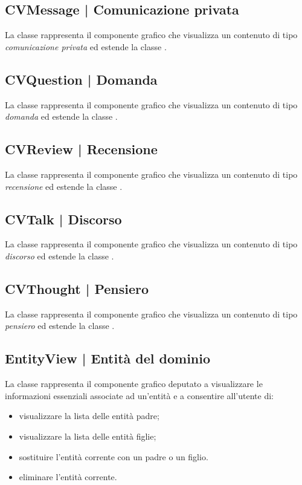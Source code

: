 \documentclass[10pt,a4paper,headinclude,footinclude,hidelinks]{scrreprt} %
\begin{document}
	\subsection[CVMessage]{CVMessage | Comunicazione privata}
	\label{sec:stage:design:view:message}
	La classe rappresenta il componente grafico che visualizza un contenuto di tipo \textit{comunicazione privata} ed estende la classe \textit{}.

	\subsection[CVQuestion]{CVQuestion | Domanda}
	\label{sec:stage:design:view:question}
	La classe rappresenta il componente grafico che visualizza un contenuto di tipo \textit{domanda} ed estende la classe \textit{}.

	\subsection[CVReview]{CVReview | Recensione}
	\label{sec:stage:design:view:review}
	La classe rappresenta il componente grafico che visualizza un contenuto di tipo \textit{recensione} ed estende la classe \textit{}.

	\subsection[CVTalk]{CVTalk | Discorso}
	\label{sec:stage:design:view:talk}
	La classe rappresenta il componente grafico che visualizza un contenuto di tipo \textit{discorso} ed estende la classe \textit{}.

	\subsection[CVThought]{CVThought | Pensiero}
	\label{sec:stage:design:view:thought}
	La classe rappresenta il componente grafico che visualizza un contenuto di tipo \textit{pensiero} ed estende la classe \textit{}.

	\subsection[EntityView]{EntityView | Entità del dominio}
	\label{sec:stage:design:view:entity-widget}
	La classe \textit{} rappresenta il componente grafico deputato a visualizzare le informazioni essenziali associate ad un'entità e a consentire all'utente di:
	\begin{itemize}
	\item visualizzare la lista delle entità padre;
	\item visualizzare la lista delle entità figlie;
	\item sostituire l'entità corrente con un padre o un figlio.
	\item eliminare l'entità corrente.
	\end{itemize}
\end{document}
